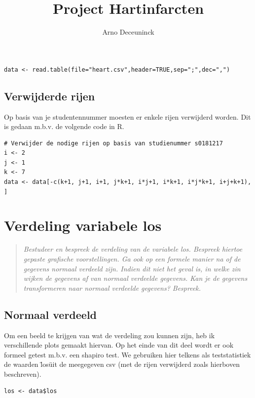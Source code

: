 \documentclass{article}
\title{Project Hartinfarcten}
\author{Arno Deceuninck}
\begin{document}
\maketitle

\tableofcontents

\begin{verbatim}
data <- read.table(file="heart.csv",header=TRUE,sep=";",dec=",")
\end{verbatim}

\subsection{Verwijderde rijen}
Op basis van je studentennummer moesten er enkele rijen verwijderd worden. Dit is gedaan m.b.v. de volgende code in R. 
\begin{verbatim}
# Verwijder de nodige rijen op basis van studienummer s0181217
i <- 2
j <- 1
k <- 7
data <- data[-c(k+1, j+1, i+1, j*k+1, i*j+1, i*k+1, i*j*k+1, i+j+k+1), ]
\end{verbatim}

\section{Verdeling variabele los}

\begin{quote}
\textit{
Bestudeer en bespreek de verdeling van de variabele los. Bespreek hiertoe gepaste grafische
voorstellingen. Ga ook op een formele manier na of de gegevens normaal verdeeld zijn.
Indien dit niet het geval is, in welke zin wijken de gegevens af van normaal verdeelde
gegevens. Kan je de gegevens transformeren naar normaal verdeelde gegevens? Bespreek.}
\end{quote}

\subsection{Normaal verdeeld}
Om een beeld te krijgen van wat de verdeling zou kunnen zijn, heb ik verschillende plots gemaakt hiervan. Op het einde van dit deel wordt er ook formeel getest m.b.v. een shapiro test. We gebruiken hier telkens als teststatistiek de waarden \"los\" uit de meegegeven csv (met de rijen verwijderd zoals hierboven beschreven).  
\begin{verbatim}
los <- data$los
\end{verbatim}
\end{document}
